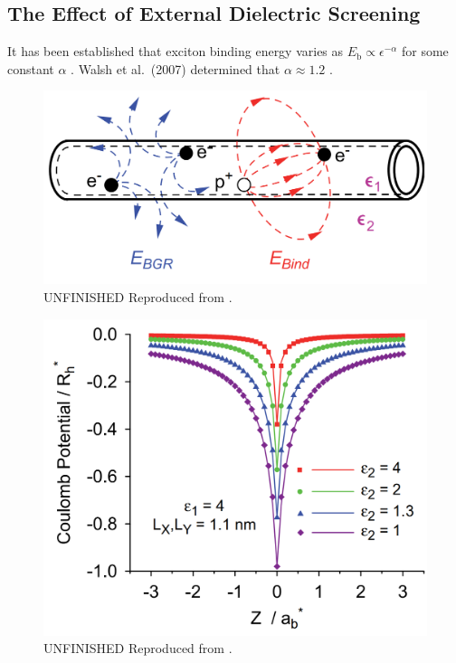 \subsection{The Effect of External Dielectric Screening}

It has been established that exciton binding energy varies as $E_\text{b} \propto \epsilon^{-\alpha}$ for some constant $\alpha$ \cite{perebeinos2004scaling}. Walsh et al.\ (2007) determined that $\alpha \approx 1.2$ \cite{walsh2008scaling}.

\begin{figure}
	\centering
	\includegraphics[scale=0.23]{images/chapter_optical_props/dielectric_screening_walsh_2007}
	\caption{{\color{red} UNFINISHED} Reproduced from \cite{walsh2008scaling}.}
\end{figure}

\begin{figure}
	\centering
	\includegraphics[scale=0.23]{images/chapter_optical_props/coulomb_potl_walsh}
	\caption{ {\color{red} UNFINISHED} Reproduced from \cite{walsh2008scaling}.}
\end{figure}

